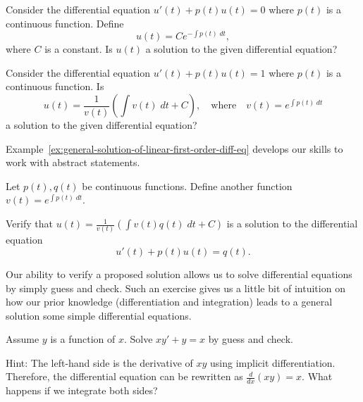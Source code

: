 \documentclass[../main.tex]{subfiles}
\begin{document}
\begin{example}
  Consider the differential equation \( u'(t) + p(t) u(t) = 0\) where \(p(t)\) is a continuous function. Define
  \[
    u(t) = C e^{-\int p(t) \;dt},
  \]
  where \(C\) is a constant. Is \(u(t)\) a solution to the given differential equation?
\end{example}


\begin{example}
  Consider the differential equation \( u'(t) + p(t) u(t) = 1 \) where \(p(t)\) is a continuous function. Is
  \[
    u(t) = \frac{1}{v(t)} \left( \int v(t) \;dt + C \right), \quad\text{where}\quad v(t) = e^{\int p(t)\;dt}
  \]
  a solution to the given differential equation?
  \clearpage
\end{example}

Example~\ref{ex:general-solution-of-linear-first-order-diff-eq} develops our skills to work with abstract statements. 

\begin{example} \label{ex:general-solution-of-linear-first-order-diff-eq}
  Let \(p(t), q(t)\) be continuous functions.  Define another function \(v(t) = e^{\int p(t) \;dt}\). 

  Verify that \(u(t) = \frac{1}{v(t)} \left( \int v(t) q(t) \;dt + C \right)\) is a solution to the differential equation
  \[
    u'(t) + p(t) u(t) = q(t).
  \]

  \clearpage
\end{example}

Our ability to verify a proposed solution allows us to solve differential equations by simply guess and check. Such an exercise gives us a little bit of intuition on how our prior knowledge (differentiation and integration) leads to a general solution some simple differential equations.
\begin{example}
  Assume \(y\) is a function of \(x\). Solve \(xy' + y = x\) by guess and check.

  Hint: The left-hand side is the derivative of \(xy\) using implicit differentiation. Therefore, the differential equation can be rewritten as \(\frac{d}{dx} \left( xy \right) = x\). What happens if we integrate both sides?
\end{example}
\end{document}
